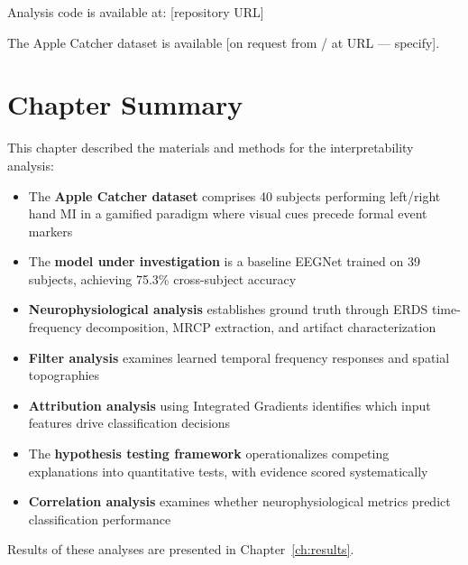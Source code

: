 Analysis code is available at: [repository URL]

The Apple Catcher dataset is available [on request from / at URL — specify].


\section{Chapter Summary}
\label{sec:methods_summary}

This chapter described the materials and methods for the interpretability analysis:

\begin{itemize}
    \item The \textbf{Apple Catcher dataset} comprises 40 subjects performing left/right hand MI in a gamified paradigm where visual cues precede formal event markers
    
    \item The \textbf{model under investigation} is a baseline EEGNet trained on 39 subjects, achieving 75.3\% cross-subject accuracy
    
    \item \textbf{Neurophysiological analysis} establishes ground truth through ERDS time-frequency decomposition, MRCP extraction, and artifact characterization
    
    \item \textbf{Filter analysis} examines learned temporal frequency responses and spatial topographies
    
    \item \textbf{Attribution analysis} using Integrated Gradients identifies which input features drive classification decisions
    
    \item The \textbf{hypothesis testing framework} operationalizes competing explanations into quantitative tests, with evidence scored systematically
    
    \item \textbf{Correlation analysis} examines whether neurophysiological metrics predict classification performance
\end{itemize}

Results of these analyses are presented in Chapter~\ref{ch:results}.


